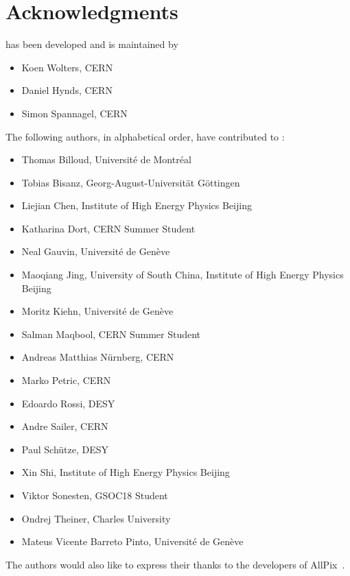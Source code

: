 \chapter{Acknowledgments}

\apsq has been developed and is maintained by

\begin{itemize}
\item Koen Wolters, CERN
\item Daniel Hynds, CERN
\item Simon Spannagel, CERN
\end{itemize}

The following authors, in alphabetical order, have contributed to \apsq:

\begin{itemize}
\item Thomas Billoud, Université de Montréal
\item Tobias Bisanz, Georg-August-Universität Göttingen
\item Liejian Chen, Institute of High Energy Physics Beijing
\item Katharina Dort, CERN Summer Student
\item Neal Gauvin, Université de Genève
\item Maoqiang Jing, University of South China, Institute of High Energy Physics Beijing
\item Moritz Kiehn, Université de Genève
\item Salman Maqbool, CERN Summer Student
\item Andreas Matthias Nürnberg, CERN
\item Marko Petric, CERN
\item Edoardo Rossi, DESY
\item Andre Sailer, CERN
\item Paul Schütze, DESY
\item Xin Shi, Institute of High Energy Physics Beijing
\item Viktor Sonesten, GSOC18 Student
\item Ondrej Theiner, Charles University
\item Mateus Vicente Barreto Pinto, Université de Genève
\end{itemize}

The authors would also like to express their thanks to the developers of AllPix~\cite{ap1wiki,ap1git}.
